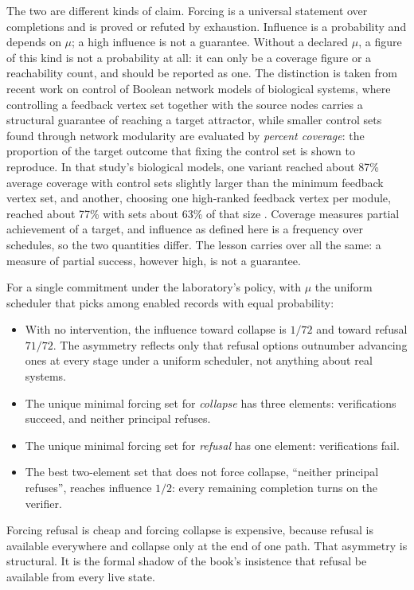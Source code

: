 \documentclass[11pt,openany]{book}
\theoremstyle{remark}
\begin{document}
The two are different kinds of claim. Forcing is a universal statement
over completions and is proved or refuted by exhaustion. Influence is a
probability and depends on $\mu$; a high influence is not a guarantee.
Without a declared $\mu$, a figure of this kind is not a probability at
all: it can only be a coverage figure or a reachability count, and should
be reported as one. The
distinction is taken from recent work on control of Boolean network
models of biological systems, where controlling a feedback vertex set
together with the source nodes carries a structural guarantee of reaching
a target attractor, while smaller control sets found through network
modularity are evaluated by \emph{percent coverage}: the proportion of the
target outcome that fixing the control set is shown to reproduce. In that
study's biological models, one variant reached about 87\% average
coverage with control sets slightly larger than the minimum feedback
vertex set, and another, choosing one high-ranked feedback vertex per
module, reached about 77\% with sets about 63\% of that size
\cite{nasrollahi}. Coverage measures partial achievement of a target, and
influence as defined here is a frequency over schedules, so the two
quantities differ. The lesson carries over all the same: a measure of
partial success, however high, is not a guarantee.

For a single commitment under the laboratory's policy, with $\mu$ the
uniform scheduler that picks among enabled records with equal
probability:
\begin{itemize}[leftmargin=1.5em]
\item With no intervention, the influence toward collapse is $1/72$ and
toward refusal $71/72$. The asymmetry reflects only that refusal options
outnumber advancing ones at every stage under a uniform scheduler, not
anything about real systems.
\item The unique minimal forcing set for \emph{collapse} has three
elements: verifications succeed, and neither principal refuses.
\item The unique minimal forcing set for \emph{refusal} has one element:
verifications fail.
\item The best two-element set that does not force collapse, ``neither
principal refuses'', reaches influence $1/2$: every remaining completion
turns on the verifier.
\end{itemize}
Forcing refusal is cheap and forcing collapse is expensive, because
refusal is available everywhere and collapse only at the end of one path.
That asymmetry is structural. It is the formal shadow of the book's
insistence that refusal be available from every live state.
\end{document}
